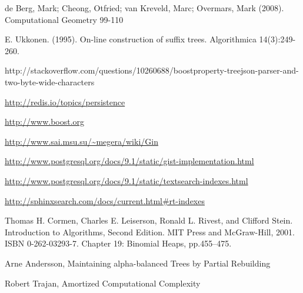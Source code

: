 \documentclass[10pt,a4paper]{article}
\begin{document}
\begin{thebibliography}{99}

 de Berg, Mark; Cheong, Otfried; van Kreveld, Marc; Overmars, Mark (2008). Computational Geometry 99-110

 E. Ukkonen. (1995). On-line construction of suffix trees. Algorithmica 14(3):249-260.

 http://stackoverflow.com/questions/10260688/boostproperty-treejson-parser-and-two-byte-wide-characters

 \url{http://redis.io/topics/persistence}

 \url{http://www.boost.org}

 \url{http://www.sai.msu.su/~megera/wiki/Gin}

 \url{http://www.postgresql.org/docs/9.1/static/gist-implementation.html}

 \url{http://www.postgresql.org/docs/9.1/static/textsearch-indexes.html}

 \url{http://sphinxsearch.com/docs/current.html#rt-indexes}

Thomas H. Cormen, Charles E. Leiserson, Ronald L. Rivest, and Clifford Stein. Introduction to Algorithms, Second Edition. MIT Press and McGraw-Hill, 2001. ISBN 0-262-03293-7. Chapter 19: Binomial Heaps, pp.455–475.

 Arne Andersson, Maintaining alpha-balanced Trees by Partial Rebuilding

 Robert Trajan, Amortized Computational Complexity

\end{thebibliography}
\end{document}
